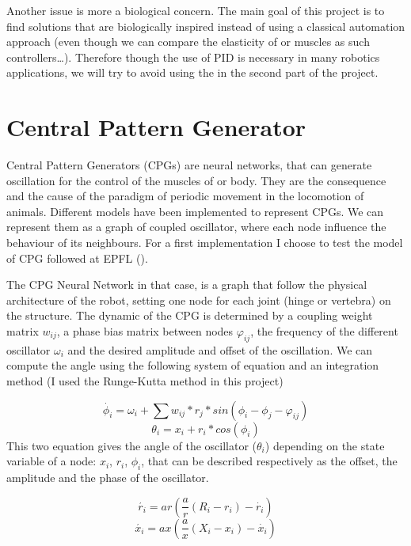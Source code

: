 Another issue is more a biological concern. The main goal of this project is to find solutions that are biologically inspired instead of using a classical automation approach (even though we can compare the elasticity of or muscles as such controllers\ldots). Therefore though the use of PID is necessary in many robotics applications, we will try to avoid using the in the second part of the project. 

\section{Central Pattern Generator}

Central Pattern Generators (CPGs) are neural networks, that can generate oscillation for the control of the muscles of or body. They are the consequence and the cause of the paradigm of periodic movement in the locomotion of animals. Different models have been implemented to represent CPGs. We can represent them as a graph of coupled oscillator, where each node influence the behaviour of its neighbours. For a first implementation I choose to test the model of CPG followed at EPFL (\cite{sproewitz}). 

The CPG Neural Network in that case, is a graph that follow the physical architecture of the robot, setting one node for each joint (hinge or vertebra) on the structure. The dynamic of the CPG is determined by a coupling weight matrix $w_{ij}$, a phase bias matrix between nodes $\varphi_{ij}$, the frequency of the different oscillator $\omega_i$ and the desired amplitude and offset of the oscillation. We can compute the angle using the following system of equation and an integration method (I used the Runge-Kutta method in this project)

\begin{equation*}
    \dot{\phi_i} = \omega_i + \sum{w_{ij} * r_j * sin(\phi_i - \phi_j - \varphi_{ij})} \tag{1}
\end{equation*}
\begin{equation*}
        \theta_i = x_i + r_i * cos(\phi_i)  \tag{2}
\end{equation*}
This two equation gives the angle of the oscillator ($\theta_i$) depending on the state variable of a node: $x_i$, $r_i$, $\phi_i$, that can be described respectively as the offset, the amplitude and the phase of the oscillator.

\begin{equation*}
    \acute{r_i} = ar(\frac ar (R_i - r_i) - \dot{r_i}) \tag{3}
\end{equation*}
\begin{equation*}
    \acute{x_i} = ax(\frac ax (X_i - x_i) - \dot{x_i}) \tag{4}
\end{equation*}

